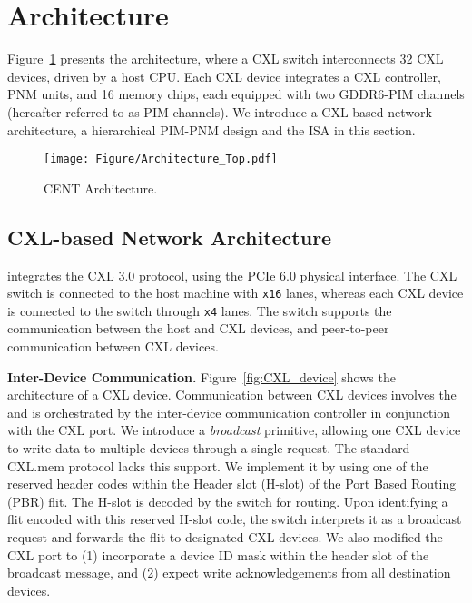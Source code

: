 \section{\att{} Architecture}

Figure~\ref{fig:Architecture_Top} presents the \att{} architecture, where a CXL switch interconnects 32 CXL devices, driven by a host CPU. 
Each CXL device integrates a CXL controller, PNM units, and 16 memory chips, each equipped with two GDDR6-PIM channels (hereafter referred to as PIM channels).
We introduce a CXL-based network architecture, a hierarchical PIM-PNM design and the \att{} ISA in this section.


\begin{figure}[h]
	\centering
  	\texttt{[image: Figure/Architecture\_Top.pdf]}
    \caption{CENT Architecture.}
	\label{fig:Architecture_Top}
\end{figure}


\subsection{CXL-based Network Architecture}
\label{sub:CXL-Network}

\att{} integrates the CXL 3.0 protocol, using the PCIe 6.0 physical interface. The CXL switch is connected to the host machine with \texttt{x16} lanes, whereas each CXL device is connected to the switch through \texttt{x4} lanes.
The switch supports the communication between the host and CXL devices, and peer-to-peer communication between CXL devices. 

\textbf{Inter-Device Communication.} 
Figure~\ref{fig:CXL_device} shows the architecture of a CXL device. Communication between CXL devices involves the \rf{} and is orchestrated by the inter-device communication controller in conjunction with the CXL port.
We introduce a \textit{broadcast} primitive, allowing one CXL device to write data to multiple devices through a single request. The standard CXL.mem protocol lacks this support. We implement it by using one of the reserved header codes within the Header slot (H-slot) of the Port Based Routing (PBR) flit. 
The H-slot is decoded by the switch for routing.
Upon identifying a flit encoded with this reserved H-slot code, the switch interprets it as a broadcast request and forwards the flit to designated CXL devices. We also modified the CXL port to (1) incorporate a device ID mask within the header slot of the broadcast message, and (2) expect write acknowledgements from all destination devices.

